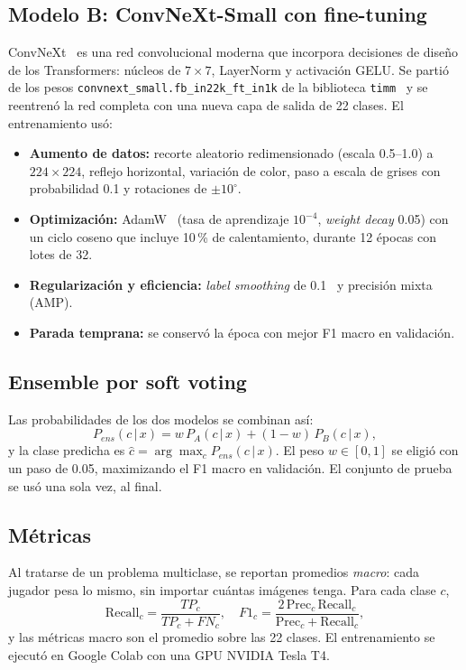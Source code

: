 \documentclass[journal]{IEEEtran}
\begin{document}
\subsection{Modelo B: ConvNeXt-Small con fine-tuning}
ConvNeXt~\cite{convnext} es una red convolucional moderna que incorpora decisiones de diseño de los Transformers: núcleos de $7\times7$, LayerNorm y activación GELU. Se partió de los pesos \texttt{convnext\_small.fb\_in22k\_ft\_in1k} de la biblioteca \texttt{timm}~\cite{timm} y se reentrenó la red completa con una nueva capa de salida de 22 clases. El entrenamiento usó:
\begin{itemize}
\item \textbf{Aumento de datos:} recorte aleatorio redimensionado (escala 0.5--1.0) a $224\times224$, reflejo horizontal, variación de color, paso a escala de grises con probabilidad 0.1 y rotaciones de $\pm10^\circ$.
\item \textbf{Optimización:} AdamW~\cite{adamw} (tasa de aprendizaje $10^{-4}$, \textit{weight decay} 0.05) con un ciclo coseno que incluye 10\,\% de calentamiento, durante 12 épocas con lotes de 32.
\item \textbf{Regularización y eficiencia:} \textit{label smoothing} de 0.1~\cite{labelsmooth} y precisión mixta (AMP).
\item \textbf{Parada temprana:} se conservó la época con mejor F1 macro en validación.
\end{itemize}

\subsection{Ensemble por soft voting}
Las probabilidades de los dos modelos se combinan así:
\begin{equation}
P_{ens}(c\,|\,x) = w\,P_{A}(c\,|\,x) + (1-w)\,P_{B}(c\,|\,x),
\end{equation}
y la clase predicha es $\hat{c}=\arg\max_c P_{ens}(c\,|\,x)$. El peso $w\in[0,1]$ se eligió con un paso de 0.05, maximizando el F1 macro en validación. El conjunto de prueba se usó una sola vez, al final.

\subsection{Métricas}
Al tratarse de un problema multiclase, se reportan promedios \textit{macro}: cada jugador pesa lo mismo, sin importar cuántas imágenes tenga. Para cada clase $c$,
\begin{equation}
\mathrm{Recall}_c=\frac{TP_c}{TP_c+FN_c},\quad
F1_c=\frac{2\,\mathrm{Prec}_c\,\mathrm{Recall}_c}{\mathrm{Prec}_c+\mathrm{Recall}_c},
\end{equation}
y las métricas macro son el promedio sobre las 22 clases. El entrenamiento se ejecutó en Google Colab con una GPU NVIDIA Tesla T4.
\end{document}
